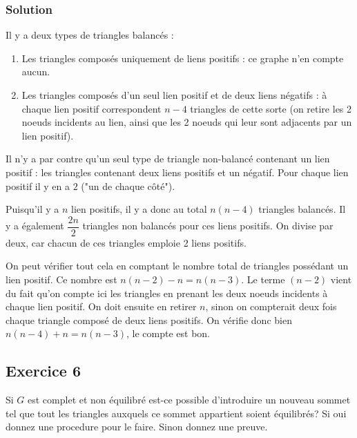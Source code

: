     \subsubsection*{Solution}
    Il y a deux types de triangles balancés :
    \begin{enumerate}
        \item Les triangles composés uniquement de liens positifs : ce graphe n'en compte aucun.
        \item Les triangles composés d'un seul lien positif et de deux liens négatifs : à chaque lien positif correspondent $n-4$ triangles de cette sorte (on retire les 2 noeuds incidents au lien, ainsi que les 2 noeuds qui leur sont adjacents par un lien positif).
    \end{enumerate}

    Il n'y a par contre qu'un seul type de triangle non-balancé contenant un lien positif : les triangles contenant deux liens positifs et un négatif.
    Pour chaque lien positif il y en a $2$ ("un de chaque côté").

    Puisqu'il y a $n$ lien positifs, il y a donc au total $n(n-4)$ triangles balancés. Il y a également $\dfrac{2n}{2}$ triangles non balancés pour ces liens positifs. On divise par deux, car chacun de ces triangles emploie 2 liens positifs.

    On peut vérifier tout cela en comptant le nombre total de triangles possédant un lien positif.
    Ce nombre est $n(n-2) - n = n(n-3)$. Le terme $(n-2)$ vient du fait qu'on compte ici les triangles en prenant les deux noeuds incidents à chaque lien positif. On doit ensuite en retirer $n$, sinon on compterait deux fois chaque triangle composé de deux liens positifs.
    On vérifie donc bien $n(n-4) + n = n(n-3)$, le compte est bon.

\subsection*{Exercice 6}
Si $G$ est complet et non \'{e}quilibr\'{e} est-ce possible d'introduire un nouveau sommet tel que tout les triangles auxquels ce sommet appartient soient \'{e}quilibr\'{e}s?
Si oui donnez une procedure pour le faire. Sinon donnez une preuve.

